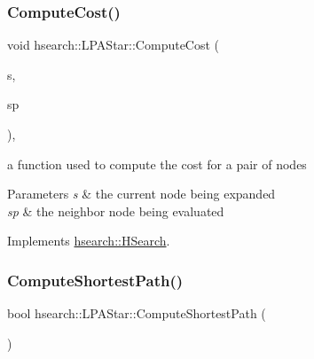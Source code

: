 \mbox{\label{classhsearch_1_1LPAStar_aaeb55f7d05b4952247e492a7db18438d}} 
\subsubsection{\texorpdfstring{Compute\+Cost()}{ComputeCost()}}
{\footnotesize\ttfamily void hsearch\+::\+L\+P\+A\+Star\+::\+Compute\+Cost (\begin{DoxyParamCaption}\item[{\hyperlink{structhsearch_1_1SearchNode}{Search\+Node} \&}]{s,  }\item[{\hyperlink{structhsearch_1_1SearchNode}{Search\+Node} \&}]{sp }\end{DoxyParamCaption})\hspace{0.3cm}{\ttfamily [protected]}, {\ttfamily [virtual]}}



a function used to compute the cost for a pair of nodes 


\begin{DoxyParams}{Parameters}
{\em s} & the current node being expanded \\
\hline
{\em sp} & the neighbor node being evaluated \\
\hline
\end{DoxyParams}


Implements \hyperlink{classhsearch_1_1HSearch_a5d325955c4faedaca0c68155fd1f7e69}{hsearch\+::\+H\+Search}.

\mbox{\label{classhsearch_1_1LPAStar_abccf3f72259c5311b62ffbfdf78a3de4}} 
\subsubsection{\texorpdfstring{Compute\+Shortest\+Path()}{ComputeShortestPath()}}
{\footnotesize\ttfamily bool hsearch\+::\+L\+P\+A\+Star\+::\+Compute\+Shortest\+Path (\begin{DoxyParamCaption}{ }\end{DoxyParamCaption})}



